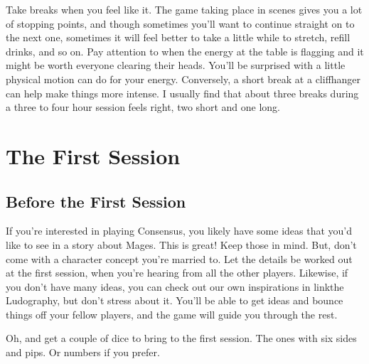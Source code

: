 \documentclass[
  oneside,
  statementpaper,
  9pt]{memoir}
\begin{document}
Take breaks when you feel like it. The game taking place in scenes gives
you a lot of stopping points, and though sometimes you'll want to
continue straight on to the next one, sometimes it will feel better to
take a little while to stretch, refill drinks, and so on. Pay attention
to when the energy at the table is flagging and it might be worth
everyone clearing their heads. You'll be surprised with a little
physical motion can do for your energy. Conversely, a short break at a
cliffhanger can help make things more intense. I usually find that about
three breaks during a three to four hour session feels right, two short
and one long.

\newpage

\hypertarget{the-first-session}{%
\chapter{The First Session}\label{the-first-session}}

\hypertarget{before-the-first-session}{%
\section{Before the First Session}\label{before-the-first-session}}

\begin{Player}

If you're interested in playing Consensus, you likely have some ideas that you'd like to see in a story about Mages. This is great! Keep those in mind. But, don't come with a character concept you're married to. Let the details be worked out at the first session, when you're hearing from all the other players. Likewise, if you don't have many ideas, you can check out our own inspirations in {{linkthe Ludography}}, but don't stress about it. You'll be able to get ideas and bounce things off your fellow players, and the game will guide you through the rest.

Oh, and get a couple of dice to bring to the first session. The ones with six sides and pips. Or numbers if you prefer.

\end{Player}
\end{document}
